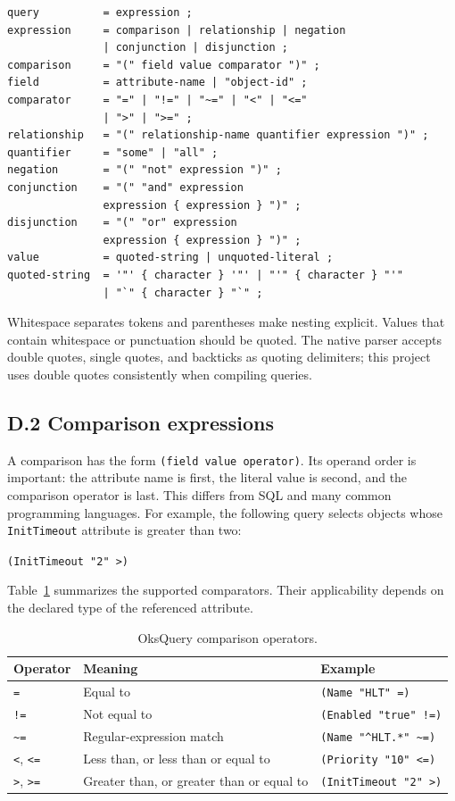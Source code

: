 \documentclass[12pt, a4paper]{report}
\begin{document}
\begin{verbatim}
query          = expression ;
expression     = comparison | relationship | negation
               | conjunction | disjunction ;
comparison     = "(" field value comparator ")" ;
field          = attribute-name | "object-id" ;
comparator     = "=" | "!=" | "~=" | "<" | "<="
               | ">" | ">=" ;
relationship   = "(" relationship-name quantifier expression ")" ;
quantifier     = "some" | "all" ;
negation       = "(" "not" expression ")" ;
conjunction    = "(" "and" expression
               expression { expression } ")" ;
disjunction    = "(" "or" expression
               expression { expression } ")" ;
value          = quoted-string | unquoted-literal ;
quoted-string  = '"' { character } '"' | "'" { character } "'"
               | "`" { character } "`" ;
\end{verbatim}

Whitespace separates tokens and parentheses make nesting explicit. Values that
contain whitespace or punctuation should be quoted. The native parser accepts
double quotes, single quotes, and backticks as quoting delimiters; this project
uses double quotes consistently when compiling queries.

\subsection*{D.2 Comparison expressions}
A comparison has the form \verb|(field value operator)|. Its operand order is
important: the attribute name is first, the literal value is second, and the
comparison operator is last. This differs from SQL and many common programming
languages. For example, the following query selects objects whose
\texttt{InitTimeout} attribute is greater than two:

\begin{center}
\verb|(InitTimeout "2" >)|
\end{center}

Table~\ref{tab:oksquery-comparators} summarizes the supported comparators.
Their applicability depends on the declared type of the referenced attribute.

\begin{table}[H]
  \centering
  \caption{OksQuery comparison operators.}
  \label{tab:oksquery-comparators}
  \small
  \begin{tabularx}{\textwidth}{@{}p{1.8cm}p{3.8cm}X@{}}
    \toprule
    \textbf{Operator} & \textbf{Meaning} & \textbf{Example} \\
    \midrule
    \verb|=| & Equal to & \verb|(Name "HLT" =)| \\
    \verb|!=| & Not equal to & \verb|(Enabled "true" !=)| \\
    \verb|~=| & Regular-expression match & \verb|(Name "^HLT.*" ~=)| \\
    \verb|<|, \verb|<=| & Less than, or less than or equal to & \verb|(Priority "10" <=)| \\
    \verb|>|, \verb|>=| & Greater than, or greater than or equal to & \verb|(InitTimeout "2" >)| \\
    \bottomrule
  \end{tabularx}
\end{table}
\end{document}
